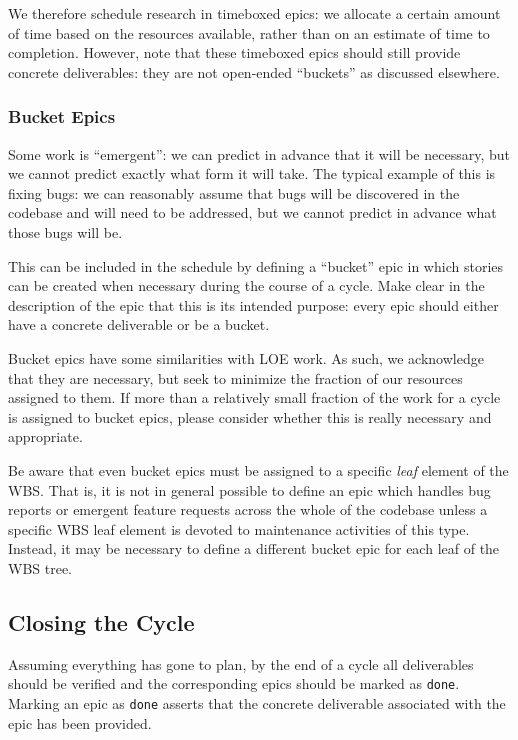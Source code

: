 We therefore schedule research in \gls{timebox}ed \glspl{epic}: we allocate a certain amount of time based on the resources available, rather than on an estimate of time to completion.
However, note that these \gls{timebox}ed \glspl{epic} should still provide concrete deliverables: they are not open-ended ``buckets'' as discussed elsewhere.

\subsubsection{Bucket Epics} \label{sec:bucket}

Some work is ``emergent'': we can predict in advance that it will be necessary, but we cannot predict exactly what form it will take.
The typical example of this is fixing bugs: we can reasonably assume that bugs will be discovered in the codebase and will need to be addressed, but we cannot predict in advance what those bugs will be.

This can be included in the schedule by defining a ``bucket'' \gls{epic} in which stories can be created when necessary during the course of a \gls{cycle}.
Make clear in the description of the \gls{epic} that this is its intended purpose: every \gls{epic} should either have a concrete deliverable or be a bucket.

Bucket \glspl{epic} have some similarities with \gls{LOE} work.
As such, we acknowledge that they are necessary, but seek to minimize the fraction of our resources assigned to them.
If more than a relatively small fraction of the work for a \gls{cycle} is assigned to bucket \glspl{epic}, please consider whether this is really necessary and appropriate.

Be aware that even bucket \glspl{epic} must be assigned to a specific \emph{leaf} \gls{element} of the \gls{WBS}.
That is, it is not in general possible to define an \gls{epic} which handles bug reports or emergent feature requests across the whole of the codebase unless a specific \gls{WBS} leaf \gls{element} is devoted to maintenance activities of this type.
Instead, it may be necessary to define a different bucket \gls{epic} for each leaf of the \gls{WBS} tree.


\subsection{Closing the Cycle} \label{sec:cycle-close}

Assuming everything has gone to plan, by the end of a \gls{cycle} all deliverables should be verified and the corresponding \glspl{epic} should be marked as \texttt{done}.
Marking an \gls{epic} as \texttt{done} asserts that the concrete deliverable associated with the \gls{epic} has been provided.


